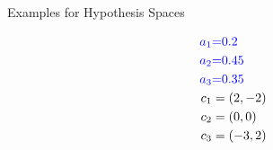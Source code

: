\documentclass[11pt,compress,t,notes=noshow, xcolor=table]{beamer}
\begin{document}
\begin{vbframe}{Examples for Hypothesis Spaces}
\begin{minipage}{0.33\textwidth}
\begin{center}
      \begin{equation*}
        \begin{split}
          \textcolor{blue}{a_1} & \textcolor{blue}{=} \textcolor{blue}{0.2} \\
          \textcolor{blue}{a_2} & \textcolor{blue}{=} \textcolor{blue}{0.45} \\
          \textcolor{blue}{a_3} & \textcolor{blue}{=} \textcolor{blue}{0.35} \\
          c_1 &= (2,-2) \\
          c_2 &= (0,0) \\
          c_3 &= (-3,2)
        \end{split}
      \end{equation*}
    \end{center}
\end{minipage}

\normalsize

% 
% 
% 
%   
%   
% 
%   

\end{vbframe}


\endlecture
\end{document}
